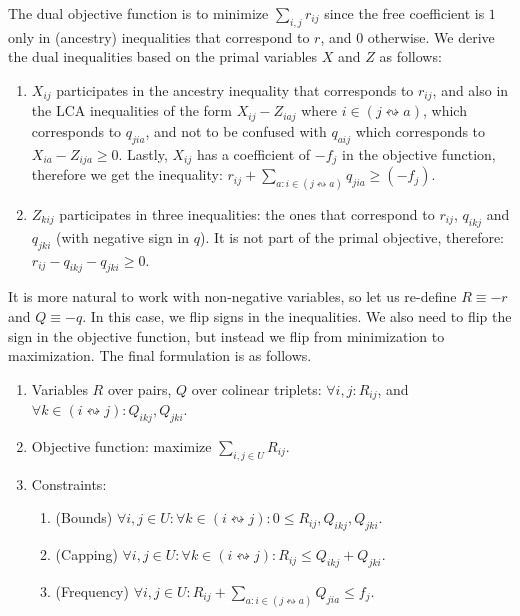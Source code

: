 The dual objective function is to minimize $\sum_{i,j}{r_{ij}}$ since the free coefficient is $1$ only in (ancestry) inequalities that correspond to $r$, and $0$ otherwise. We derive the dual inequalities based on the primal variables $X$ and $Z$ as follows:
\begin{enumerate}
    \item $X_{ij}$ participates in the ancestry inequality that corresponds to $r_{ij}$, and also in the LCA inequalities of the form $X_{ij} - Z_{iaj}$ where $i \in (j \leftrightsquigarrow a)$,  which corresponds to $q_{jia}$, and not to be confused with $q_{aij}$ which corresponds to $X_{ia} - Z_{ija} \ge 0$. Lastly, $X_{ij}$ has a coefficient of $-f_j$ in the objective function, therefore we get the inequality: $r_{ij} + \sum_{a : i \in (j \leftrightsquigarrow a)}{q_{jia}} \ge (-f_j)$.

    \item $Z_{kij}$ participates in three inequalities: the ones that correspond to $r_{ij}$, $q_{ikj}$ and $q_{jki}$ (with negative sign in $q$). It is not part of the primal objective, therefore: $r_{ij} - q_{ikj} - q_{jki} \ge 0$.
\end{enumerate}

It is more natural to work with non-negative variables, so let us re-define $R \equiv -r$ and $Q \equiv -q$. In this case, we flip signs in the inequalities. We also need to flip the sign in the objective function, but instead we flip from minimization to maximization. The final formulation is  as follows.

\begin{definition}
\label{definition_dual_LP_program}
    \mbox{}
    \begin{enumerate}
        \item Variables $R$ over pairs, $Q$ over colinear triplets: $\forall i, j: R_{ij}$, and $\forall k \in (i \leftrightsquigarrow j): Q_{ikj},Q_{jki}$.

        \item Objective function: maximize $\sum_{i,j \in U}{R_{ij}}$.

        \item Constraints:
        \begin{enumerate}
            \item (Bounds) $\forall i,j \in U: \forall k \in (i \leftrightsquigarrow j): 0 \le R_{ij},Q_{ikj},Q_{jki}$.

            \item (Capping) $\forall i,j \in U: \forall k \in (i \leftrightsquigarrow j): R_{ij} \le Q_{ikj} + Q_{jki}$.

            \item (Frequency) $\forall i,j \in U: R_{ij} + \sum_{a : i \in (j \leftrightsquigarrow a)}{Q_{jia}} \le f_j$.
        \end{enumerate}
    \end{enumerate}
\end{definition}



